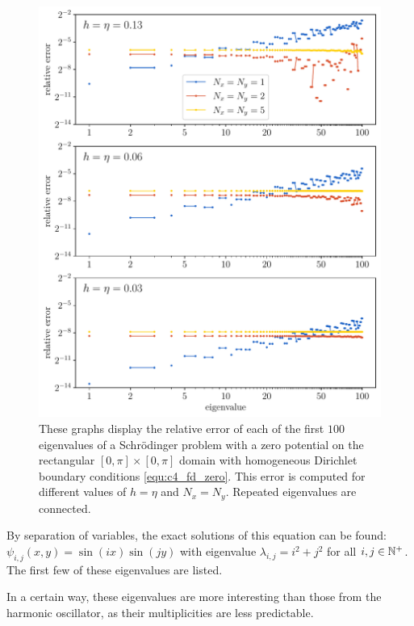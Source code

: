 \begin{figure}
    \begin{center}
        \includegraphics[width=\textwidth]{img/chapter4/fd_zero.pdf}
    \end{center}
    \caption{These graphs display the relative error of each of the first $100$ eigenvalues of a Schrödinger problem with a zero potential on the rectangular $[0, \pi] \times [0, \pi]$ domain with homogeneous Dirichlet boundary conditions \eqref{equ:c4_fd_zero}. This error is computed for different values of $h = \eta$ and $N_x = N_y$. Repeated eigenvalues are connected.}
    \label{fig:c4_fd_zero}
\end{figure}

By separation of variables, the exact solutions of this equation can be found: $\psi_{i, j}(x, y) = \sin(i x)\sin(j y)$ with eigenvalue $\lambda_{i,j} = i^2 + j^2$ for all $i, j \in \mathbb{N}^{+}$. The first few of these eigenvalues are listed.

In a certain way, these eigenvalues are more interesting than those from the harmonic oscillator, as their multiplicities are less predictable.

